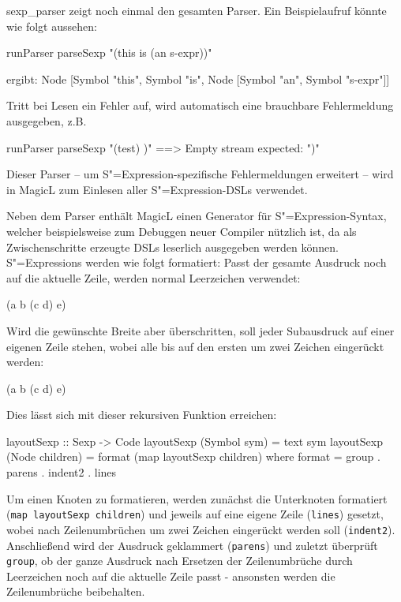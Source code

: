 \documentclass[12pt, a4paper, bibgerm]{scrbook}
\newenvironment{DIFnomarkup}{}{}
\newcommand\icode[1]{\lstinline?#1?}
\newcommand\abb{}
\newcommand{\sexp}{S"=Expression}
\newcommand{\sexps}{S"=Expressions}
\begin{document}
\abb{sexp_parser} zeigt noch einmal den gesamten Parser. Ein
Beispielaufruf könnte wie folgt aussehen:
\begin{code}
runParser parseSexp "(this is (an s-expr))"  

ergibt: 
Node [Symbol "this", Symbol "is", Node [Symbol "an", Symbol "s-expr"]]
\end{code}
Tritt bei Lesen ein Fehler auf, wird automatisch eine brauchbare
Fehlermeldung ausgegeben, z.B.
\begin{DIFnomarkup}\begin{code}
runParser parseSexp "(test) )"  ==>  Empty stream expected: ")"
\end{code}\end{DIFnomarkup}
Dieser Parser -- um \sexp{}-spezifische Fehlermeldungen erweitert --
wird in MagicL zum Einlesen aller \sexp{}-DSLs verwendet.

Neben dem Parser enthält MagicL einen Generator für \sexp{}-Syntax,
welcher beispielsweise zum Debuggen neuer Compiler nützlich ist, da als
Zwischenschritte erzeugte DSLs leserlich ausgegeben werden können.
\sexps{} werden wie folgt formatiert: Passt der gesamte Ausdruck noch
auf die aktuelle Zeile, werden normal Leerzeichen verwendet:
\begin{DIFnomarkup}\begin{code}
(a b (c d) e)
\end{code}\end{DIFnomarkup}
Wird die gewünschte Breite aber überschritten, soll jeder Subausdruck
auf einer eigenen Zeile stehen, wobei alle bis auf den ersten um zwei
Zeichen eingerückt werden:
\begin{DIFnomarkup}\begin{code}
(a
  b
  (c d)
  e)
\end{code}\end{DIFnomarkup}
Dies lässt sich mit dieser rekursiven Funktion erreichen:
\begin{DIFnomarkup}\begin{code}
layoutSexp :: Sexp -> Code
layoutSexp (Symbol sym)    = text sym
layoutSexp (Node children) = format (map layoutSexp children)
  where format = group . parens . indent2 . lines
\end{code}\end{DIFnomarkup} %

Um einen Knoten zu formatieren, werden zunächst die Unterknoten
formatiert \\ (\icode{map layoutSexp children}) und jeweils auf eine eigene
Zeile (\icode{lines}) gesetzt, wobei nach Zeilenumbrüchen um zwei
Zeichen eingerückt werden soll (\icode{indent2}). Anschließend wird
der Ausdruck geklammert (\icode{parens}) und zuletzt überprüft
\icode{group}, ob der ganze Ausdruck nach Ersetzen der Zeilenumbrüche
durch Leerzeichen noch auf die aktuelle Zeile passt - ansonsten werden
die Zeilenumbrüche beibehalten.
\end{document}

